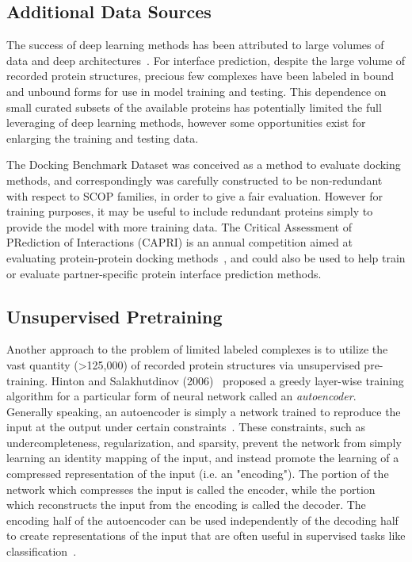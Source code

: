 \subsection{Additional Data Sources}

The success of deep learning methods has been attributed to large volumes of data and deep architectures~\cite{krizhevsky2012}.
For interface prediction, despite the large volume of recorded protein structures, precious few complexes have been labeled in bound and unbound forms for use in model training and testing. 
This dependence on small curated subsets of the available proteins has potentially limited the full leveraging of deep learning methods, however some opportunities exist for enlarging the training and testing data.

The Docking Benchmark Dataset was conceived as a method to evaluate docking methods, and correspondingly was carefully constructed to be non-redundant with respect to SCOP families, in order to give a fair evaluation.
However for training purposes, it may be useful to include redundant proteins simply to provide the model with more training data. 
The Critical Assessment of PRediction of Interactions (CAPRI) is an annual competition aimed at evaluating protein-protein docking methods~\cite{janin2003}, and could also be used to help train or evaluate partner-specific protein interface prediction methods. 

\subsection{Unsupervised Pretraining}

Another approach to the problem of limited labeled complexes is to utilize the vast quantity (>125,000) of recorded protein structures via unsupervised pre-training.
Hinton and Salakhutdinov (2006)~\cite{hinton2006b} proposed a greedy layer-wise training algorithm for a particular form of neural network called an \emph{autoencoder}.
Generally speaking, an autoencoder is simply a network trained to reproduce the input at the output under certain constraints~\cite{goodfellow2016}.
These constraints, such as undercompleteness, regularization, and sparsity, prevent the network from simply learning an identity mapping of the input, and instead promote the learning of a compressed representation of the input (i.e. an "encoding").
The portion of the network which compresses the input is called the encoder, while the portion which reconstructs the input from the encoding is called the decoder.
The encoding half of the autoencoder can be used independently of the decoding half to create representations of the input that are often useful in supervised tasks like classification~\cite{hinton2006b, bengio2007}.

